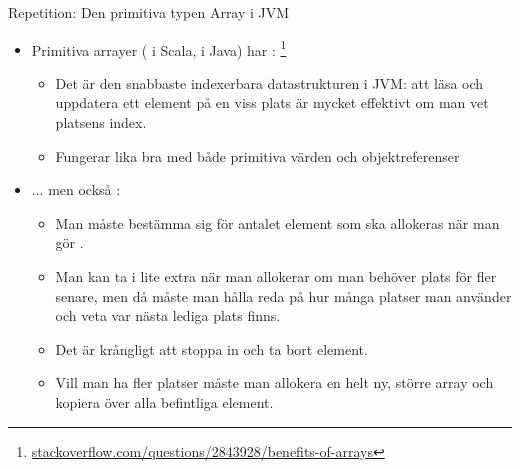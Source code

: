 \begin{Slide}{Repetition: Den primitiva typen Array i JVM}
\begin{itemize}
\item Primitiva arrayer ( i Scala, \code{[]} i Java) har :%
\footnote{\href{http://stackoverflow.com/questions/2843928/benefits-of-arrays}{stackoverflow.com/questions/2843928/benefits-of-arrays}}
\begin{itemize}\SlideFontSmall
\item Det är den snabbaste indexerbara datastrukturen i JVM: att läsa och uppdatera ett element på en viss plats är mycket effektivt om man vet platsens index.
\item Fungerar lika bra med både primitiva värden och objektreferenser
\end{itemize}
\item ... men också :
\begin{itemize}\SlideFontSmall
\item Man måste bestämma sig för antalet element som ska allokeras när man gör .
\item Man kan ta i lite extra när man allokerar om man behöver plats för fler senare, men då måste man hålla reda på hur många platser man använder och veta var nästa lediga plats finns.
\item Det är krångligt att stoppa in  och ta bort  element.
\item Vill man ha fler platser måste man allokera en helt ny, större array och kopiera över alla befintliga element.
\end{itemize}

\end{itemize}
\end{Slide}




